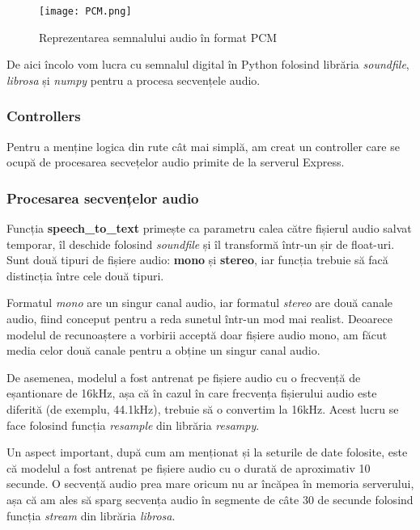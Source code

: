 \begin{figure}[h]
    \centering
    \texttt{[image: PCM.png]}
    \caption{Reprezentarea semnalului audio în format PCM\protect\footnotemark[2]}
    \label{fig:pcm}
\end{figure}

\par
De aici încolo vom lucra cu semnalul digital în Python folosind librăria \textit{soundfile},
\textit{librosa} și \textit{numpy} pentru a procesa secvențele audio.


\subsubsection{Controllers}
Pentru a menține logica din rute cât mai simplă, am creat un controller care se ocupă de procesarea
secvețelor audio primite de la serverul Express. 

\subsubsection{Procesarea secvențelor audio}
\par
Funcția \textbf{speech\_to\_text} primește ca parametru calea către fișierul audio salvat temporar,
îl deschide folosind \textit{soundfile} și îl transformă într-un șir de float-uri.
Sunt două tipuri de fișiere audio: \textbf{mono} și \textbf{stereo}, iar funcția trebuie să facă distincția
între cele două tipuri. 

\par
Formatul \textit{mono} are un singur canal audio, iar formatul \textit{stereo} are două canale audio, 
fiind conceput pentru a reda sunetul într-un mod mai realist. Deoarece modelul de recunoaștere a vorbirii
acceptă doar fișiere audio mono, am făcut media celor două canale pentru a obține un singur canal audio.

\par
De asemenea, modelul a fost antrenat pe fișiere audio cu o frecvență de eșantionare de 16kHz, așa că
în cazul în care frecvența fișierului audio este diferită (de exemplu, 44.1kHz), trebuie să o convertim
la 16kHz. Acest lucru se face folosind funcția \textit{resample} din librăria \textit{resampy}.

\par
Un aspect important, după cum am menționat și la seturile de date folosite, este că modelul a fost
antrenat pe fișiere audio cu o durată de aproximativ 10 secunde. O secvență audio prea mare oricum
nu ar încăpea în memoria serverului, așa că am ales să sparg secvența audio în segmente de câte 30 de
secunde folosind funcția \textit{stream} din librăria \textit{librosa}.

